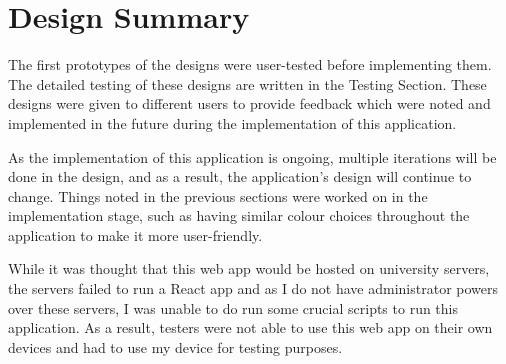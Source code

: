 \newpage
\section{Design Summary}
The first prototypes of the designs were user-tested before implementing them. The detailed testing of these designs are written in the Testing Section. These designs were given to different users to provide feedback which were noted and implemented in the future during the implementation of this application. 

As the implementation of this application is ongoing, multiple iterations will be done in the design, and as a result, the application's design will continue to change. Things noted in the previous sections were worked on in the implementation stage, such as having similar colour choices throughout the application to make it more user-friendly. 

While it was thought that this web app would be hosted on university servers, the servers failed to run a React app and as I do not have administrator powers over these servers, I was unable to do run some crucial scripts to run this application. As a result, testers were not able to use this web app on their own devices and had to use my device for testing purposes. 